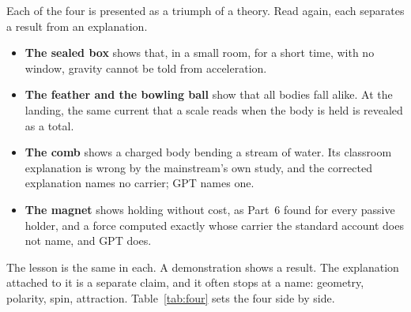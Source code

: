 Each of the four is presented as a triumph of a theory. Read again, each separates a result from an explanation.

\begin{itemize}
    \item \textbf{The sealed box} shows that, in a small room, for a short time, with no window, gravity cannot be told from acceleration.  
    \item \textbf{The feather and the bowling ball} show that all bodies fall alike.  At the landing, the same current that a scale reads when the body is held is revealed as a total.
    \item \textbf{The comb} shows a charged body bending a stream of water. Its classroom explanation is wrong by the mainstream's own study, and the corrected explanation names no carrier; GPT names one.
    \item \textbf{The magnet} shows holding without cost, as Part~6 found for every passive holder, and a force computed exactly whose carrier the standard account does not name, and GPT does.
\end{itemize}

The lesson is the same in each. A demonstration shows a result. The explanation attached to it is a separate claim, and it often stops at a name: geometry, polarity, spin, attraction. Table~\ref{tab:four} sets the four side by side.

